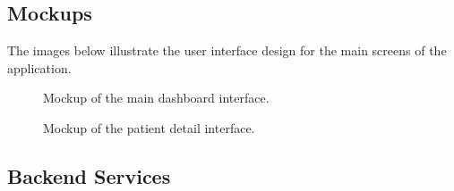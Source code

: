 \subsection{Mockups}
The images below illustrate the user interface design for the main screens of the application.

\begin{figure}[h]
    \centering
    \caption{Mockup of the main dashboard interface.}
    \label{fig:dashboard_mockup}
\end{figure}

\begin{figure}[h]
    \centering
    \caption{Mockup of the patient detail interface.}
    \label{fig:patient_detail_mockup}
\end{figure}


\subsection{Backend Services}

